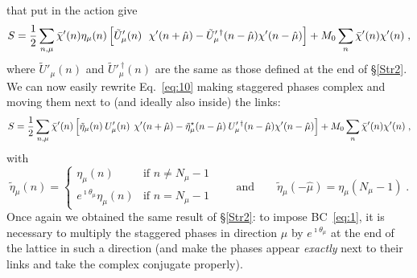 \documentclass[a4paper,10pt]{article}
\newcommand{\Eq}[1]{Eq.~\eqref{eq:#1}}
\begin{document}
that put in the action give
\begin{equation}\label{eq:10}
 S=\frac{1}{2}\sum_{n,\mu}\bar\chi'(n)\eta_\mu(n)\,
   \Bigl[\tilde{U}'_\mu(n)^{\phantom{\dag}}\:\chi'(n+\hat\mu)-
         \tilde{U}'^{\:\dag}_\mu(n-\hat\mu)\chi'(n-\hat\mu)\Bigr]+M_0\sum_n \bar\chi'(n)\chi'(n)\;,
\end{equation}
where $\tilde{U}'_\mu(n)$ and $\tilde{U}'^{\:\dag}_\mu(n)$ are the same as those defined at the
end of §\ref{Str2}. We can now easily rewrite \Eq{10} making staggered phases complex and moving
them next to (and ideally also inside) the links:
\begin{equation}\label{eq:11}
 S=\frac{1}{2}\sum_{n,\mu}\bar\chi'(n)\,
   \Bigl[\tilde{\eta}_\mu(n)\:U'_\mu(n)^{\phantom{\dag}}\chi'(n+\hat\mu)-
         \tilde{\eta}^\star_\mu(n-\hat\mu)\:U'^{\:\dag}_\mu(n-\hat\mu)\chi'(n-\hat\mu)\Bigr]+M_0\sum_n \bar\chi'(n)\chi'(n)\;,
\end{equation}
with
\[
 \tilde{\eta}_\mu(n)=\begin{cases} \eta_\mu(n) &\text{if }n\neq N_\mu-1 \\
                                 e^{\imath\theta_\mu} \eta_\mu(n) &\text{if }n=N_\mu-1 \end{cases} \qquad
                                 \text{and}\qquad \tilde{\eta}_\mu(-\hat\mu)=\eta_\mu(N_\mu-1)\;.
\]
Once again we obtained the same result of §\ref{Str2}: to impose BC~\eqref{eq:1}, it is
necessary to multiply the staggered phases in direction $\mu$ by $e^{\imath\theta_\mu}$
at the end of the lattice in such a direction (and make the phases appear \emph{exactly}
next to their links and take the complex conjugate properly).

\medskip
\end{document}
